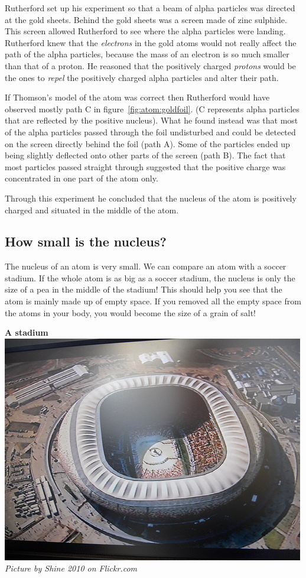 \label{m38756*id254715}Rutherford set up his experiment so that a beam of alpha particles was directed at the gold sheets. Behind the gold sheets was a screen made of zinc sulphide. This screen allowed Rutherford to see where the alpha particles were landing. Rutherford knew that the \textsl{electrons} in the gold atoms would not really affect the path of the alpha particles, because the mass of an electron is so much smaller than that of a proton. He reasoned that the positively charged \textsl{protons} would be the ones to \textsl{repel} the positively charged alpha particles and alter their path.\par 
If Thomson's model of the atom was correct then Rutherford would have observed mostly path C in figure~\ref{fig:atom:goldfoil}. (C represents alpha particles that are reflected by the positive nucleus). What he found instead was that most of the alpha particles passed through the foil undisturbed and could be detected on the screen directly behind the foil (path A). Some of the particles ended up being slightly deflected onto other parts of the screen (path B).  The fact that most particles passed straight through suggested that the positive charge was concentrated in one part of the atom only.\par 
Through this experiment he concluded that the nucleus of the atom is positively charged and situated in the middle of the atom.
\subsection*{How small is the nucleus?}
\begin{minipage}{.5\textwidth}
The nucleus of an atom is very small. We can compare an atom with a soccer stadium. If the whole atom is as big as a soccer stadium, the nucleus is only the size of a pea in the middle of the stadium! This should help you see that the atom is mainly made up of empty space. If you removed all the empty space from the atoms in your body, you would become the size of a grain of salt!
\end{minipage}
\begin{minipage}{.5\textwidth}
\begin{center}
\textbf{A stadium}\\
 \includegraphics[width=.4\textwidth]{photos/stadiumby-shine2010-flickr.jpg}\\
\textit{Picture by Shine 2010 on Flickr.com}
\end{center}
\end{minipage}
      \label{m38756*eip-491}
